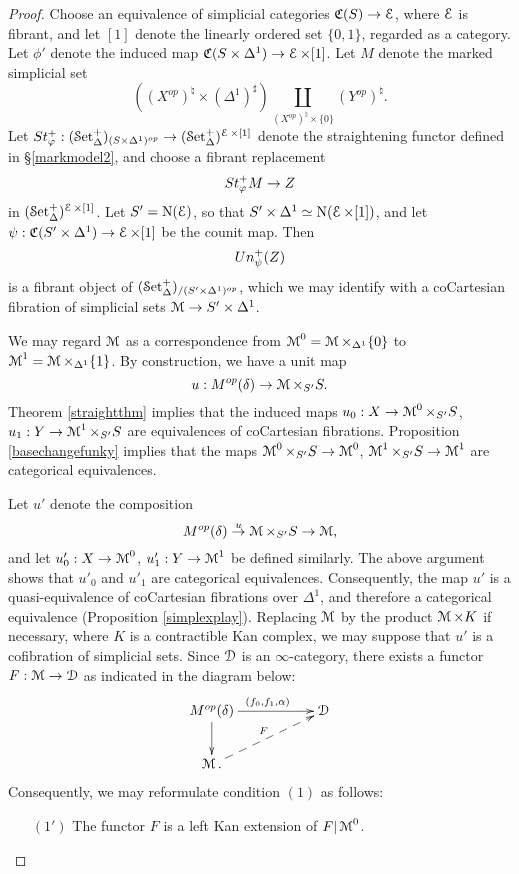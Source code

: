 \begin{proof}
Choose an equivalence of simplicial categories $\operatorname{\mathfrak{C}}(S) \rightarrow \operatorname{\mathcal{E}}$, where $\operatorname{\mathcal{E}}$ is fibrant, and let $[1]$ denote the linearly ordered set $\{0,1\}$, regarded as a category. Let
$\phi'$ denote the induced map $\operatorname{\mathfrak{C}}( S \times \Delta^1) \rightarrow \operatorname{\mathcal{E}} \times [1]$.
Let $M$ denote the marked simplicial set
$$((X^{op})^{\natural} \times (\Delta^1)^{\sharp}) \coprod_{ (X^{op})^{\natural} \times \{0\} }
( Y^{op})^{\natural}.$$
Let $St_{\varphi}^{+}: (\operatorname{\mathcal{S}et_{\Delta}^{+}})_{(S \times \Delta^1)^{op}} \rightarrow (\operatorname{\mathcal{S}et_{\Delta}^{+}})^{\operatorname{\mathcal{E}} \times [1]}$ denote the straightening functor defined in \S \ref{markmodel2}, and choose a fibrant replacement
$$ St_{\varphi}^{+} M \rightarrow Z$$
in $(\operatorname{\mathcal{S}et_{\Delta}^{+}})^{\operatorname{\mathcal{E}} \times [1]}$. 
Let $S' = \operatorname{N}(\operatorname{\mathcal{E}})$, so that $S' \times \Delta^1 \simeq
\operatorname{N}(\operatorname{\mathcal{E}} \times [1])$, and let $\psi: \operatorname{\mathfrak{C}}(S' \times \Delta^1) \rightarrow \operatorname{\mathcal{E}} \times [1]$
be the counit map. Then $$Un^{+}_{\psi}(Z)$$
is a fibrant object of $(\operatorname{\mathcal{S}et_{\Delta}^{+}})_{/ (S' \times \Delta^1)^{op}}$, which we may identify with a coCartesian fibration of simplicial sets $\operatorname{\mathcal{M}} \rightarrow S' \times \Delta^1$. 

We may regard $\operatorname{\mathcal{M}}$ as a correspondence from $\operatorname{\mathcal{M}}^{0} = \operatorname{\mathcal{M}} \times_{\Delta^1} \{0\}$ to
$\operatorname{\mathcal{M}}^{1} = \operatorname{\mathcal{M}} \times_{\Delta^1} \{1\}$. By construction, we have a unit map
$$ u: M^{op}(\delta) \rightarrow \operatorname{\mathcal{M}} \times_{S'} S.$$
Theorem \ref{straightthm} implies that the induced maps
$u_0: X \rightarrow \operatorname{\mathcal{M}}^{0} \times_{S'} S$, $u_1: Y \rightarrow \operatorname{\mathcal{M}}^{1} \times_{S'} S$ are equivalences of coCartesian fibrations. Proposition \ref{basechangefunky} implies that the maps
$\operatorname{\mathcal{M}}^{0} \times_{S'} S \rightarrow \operatorname{\mathcal{M}}^{0}$, $\operatorname{\mathcal{M}}^{1} \times_{S'} S \rightarrow \operatorname{\mathcal{M}}^{1}$ are categorical equivalences. 

Let $u'$ denote the composition
$$ M^{op}(\delta) \stackrel{u}{\rightarrow} \operatorname{\mathcal{M}} \times_{S'} S \rightarrow \operatorname{\mathcal{M}},$$
and let $u'_0: X \rightarrow \operatorname{\mathcal{M}}^{0}$, $u'_1: Y \rightarrow \operatorname{\mathcal{M}}^{1}$ be defined similarly. The above argument shows that $u'_0$ and $u'_1$ are categorical equivalences. 
Consequently, the map $u'$ is a quasi-equivalence of coCartesian fibrations over $\Delta^1$, and therefore a categorical equivalence (Proposition \ref{simplexplay}). Replacing $\operatorname{\mathcal{M}}$ by the product
$\operatorname{\mathcal{M}} \times K$ if necessary, where $K$ is a contractible Kan complex, we may suppose that $u'$ is a cofibration of simplicial sets. Since $\operatorname{\mathcal{D}}$ is an $\infty$-category, there exists a functor $F: \operatorname{\mathcal{M}} \rightarrow \operatorname{\mathcal{D}}$ as indicated in the diagram below:
$$ \xymatrix{ M^{op}(\delta) \ar[rr]^{ (f_0, f_1, \alpha)} \ar[d] & & \calD \\
\calM. \ar@{-->}[urr]^{F} & & }$$
Consequently, we may reformulate condition $(1)$ as follows:
\begin{itemize}
\item[$(1')$] The functor $F$ is a left Kan extension of
$F | \operatorname{\mathcal{M}}^{0}$. 
\end{itemize}


\end{proof}
